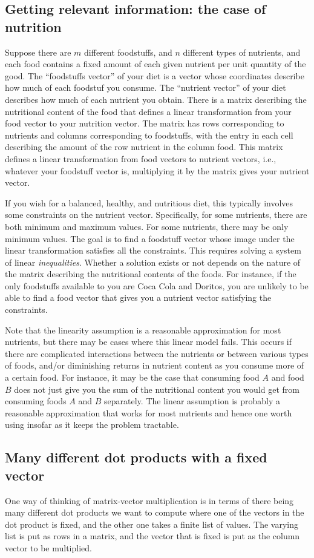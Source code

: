 \documentclass[10pt]{amsart}
\begin{document}
\subsection{Getting relevant information: the case of nutrition}

Suppose there are $m$ different foodstuffs, and $n$ different types of
nutrients, and each food contains a fixed amount of each given
nutrient per unit quantity of the good. The ``foodstuffs vector'' of
your diet is a vector whose coordinates describe how much of each
foodstuf you consume. The ``nutrient vector'' of your diet describes
how much of each nutrient you obtain. There is a matrix describing the
nutritional content of the food that defines a linear transformation
from your food vector to your nutrition vector. The matrix has rows
corresponding to nutrients and columns corresponding to foodstuffs,
with the entry in each cell describing the amount of the row nutrient
in the column food. This matrix defines a linear transformation from
food vectors to nutrient vectors, i.e., whatever your foodstuff vector
is, multiplying it by the matrix gives your nutrient vector.

If you wish for a balanced, healthy, and nutritious diet, this
typically involves some constraints on the nutrient
vector. Specifically, for some nutrients, there are both minimum and
maximum values. For some nutrients, there may be only minimum
values. The goal is to find a foodstuff vector whose image under the
linear transformation satisfies all the constraints. This requires
solving a system of linear {\em inequalities}. Whether a solution
exists or not depends on the nature of the matrix describing the
nutritional contents of the foods. For instance, if the only
foodstuffs available to you are Coca Cola and Doritos, you are
unlikely to be able to find a food vector that gives you a nutrient
vector satisfying the constraints.

Note that the linearity assumption is a reasonable approximation for
most nutrients, but there may be cases where this linear model
fails. This occurs if there are complicated interactions between the
nutrients or between various types of foods, and/or diminishing
returns in nutrient content as you consume more of a certain food. For
instance, it may be the case that consuming food $A$ and food $B$ does
not just give you the sum of the nutritional content you would get
from consuming foods $A$ and $B$ separately. The linear assumption is
probably a reasonable approximation that works for most nutrients and
hence one worth using insofar as it keeps the problem tractable.

\subsection{Many different dot products with a fixed vector}

One way of thinking of matrix-vector multiplication is in terms of
there being many different dot products we want to compute where one
of the vectors in the dot product is fixed, and the other one takes a
finite list of values. The varying list is put as rows in a matrix,
and the vector that is fixed is put as the column vector to be
multiplied.
\end{document}
